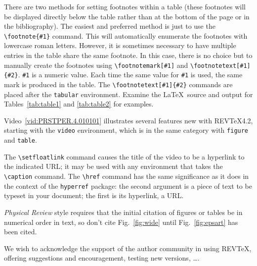 \documentclass[%
 reprint,
 amsmath,amssymb,
 aps,
]{revtex4-2}
\begin{document}
There are two methods for setting footnotes within a table (these
footnotes will be displayed directly below the table rather than at
the bottom of the page or in the bibliography). The easiest
and preferred method is just to use the \verb+\footnote{#1}+
command. This will automatically enumerate the footnotes with
lowercase roman letters. However, it is sometimes necessary to have
multiple entries in the table share the same footnote. In this case,
there is no choice but to manually create the footnotes using
\verb+\footnotemark[#1]+ and \verb+\footnotetext[#1]{#2}+.
\texttt{\#1} is a numeric value. Each time the same value for
\texttt{\#1} is used, the same mark is produced in the table. The
\verb+\footnotetext[#1]{#2}+ commands are placed after the \texttt{tabular}
environment. Examine the \LaTeX\ source and output for
Tables~\ref{tab:table1} and \ref{tab:table2}
for examples.

Video~\ref{vid:PRSTPER.4.010101} 
illustrates several features new with REV\TeX4.2,
starting with the \texttt{video} environment, which is in the same category with
\texttt{figure} and \texttt{table}.%
\begin{video}
 \quad
 \caption{\label{vid:PRSTPER.4.010101}%
  Students explain their initial idea about Newton's third law to a teaching assistant. 
  Clip (a): same force.
  Clip (b): move backwards.
 }%
\end{video}
The \verb+\setfloatlink+ command causes the title of the video to be a hyperlink to the
indicated URL; it may be used with any environment that takes the \verb+\caption+
command.
The \verb+\href+ command has the same significance as it does in the context of
the \texttt{hyperref} package: the second argument is a piece of text to be 
typeset in your document; the first is its hyperlink, a URL.

\textit{Physical Review} style requires that the initial citation of
figures or tables be in numerical order in text, so don't cite
Fig.~\ref{fig:wide} until Fig.~\ref{fig:epsart} has been cited.

\begin{acknowledgments}
We wish to acknowledge the support of the author community in using
REV\TeX{}, offering suggestions and encouragement, testing new versions,
\dots.
\end{acknowledgments}
\end{document}
